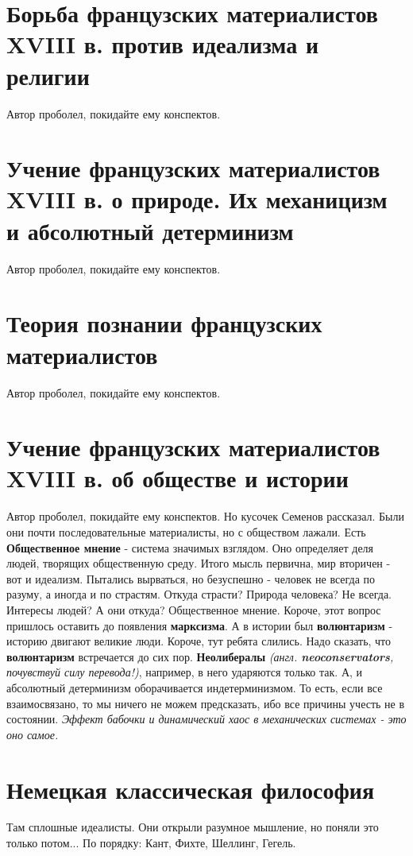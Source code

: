 \section{Борьба французских материалистов XVIII в. против идеализма и религии}
Автор проболел, покидайте ему конспектов.
\section{Учение французских материалистов XVIII в. о природе. Их механицизм и абсолютный детерминизм}
Автор проболел, покидайте ему конспектов.
\section{Теория познании французских материалистов}
Автор проболел, покидайте ему конспектов.
\section{Учение французских материалистов XVIII в.  об обществе и истории}
Автор проболел, покидайте ему конспектов. Но кусочек Семенов рассказал. Были они почти последовательные материалисты, но с обществом лажали. Есть \textbf{Общественное мнение} - система значимых взглядом. Оно определяет деля людей, творящих общественную среду. Итого мысль первична, мир вторичен - вот и идеализм. Пытались вырваться, но безуспешно - человек не всегда по разуму, а иногда и по страстям. Откуда страсти? Природа человека? Не всегда. Интересы людей? А они откуда? Общественное мнение. Короче, этот вопрос пришлось оставить до появления \textbf{марксизма}. А в истории был \textbf{волюнтаризм} - историю двигают великие люди. Короче, тут ребята слились. Надо сказать, что \textbf{волюнтаризм} встречается до сих пор. \textbf{Неолибералы} \textit{(англ. \textbf{neoconservators}, почувствуй силу перевода!)}, например, в него ударяются только так. А, и абсолютный детерминизм оборачивается индетерминизмом. То есть, если все взаимосвязано, то мы ничего не можем предсказать, ибо все причины учесть не в состоянии. \textit{Эффект бабочки и динамический хаос в механических системах - это оно самое. }
\section{Немецкая классическая философия}
Там сплошные идеалисты. Они открыли разумное мышление, но поняли это только потом... По порядку: Кант, Фихте, Шеллинг, Гегель.

